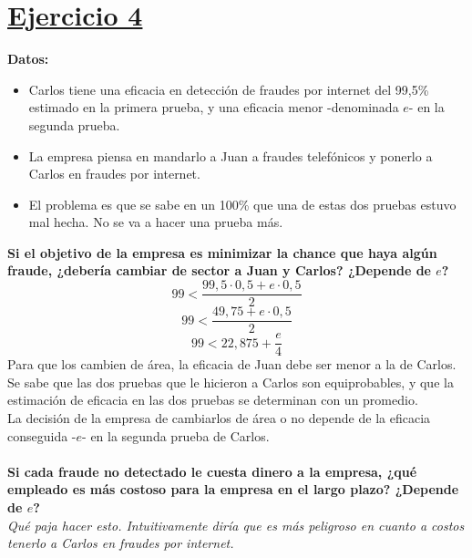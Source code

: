 \documentclass{article}
\begin{document}
    \section*{\underline{Ejercicio 4}}
        \textbf{Datos:}
        \begin{itemize}
            \item Carlos tiene una eficacia en detección de fraudes por internet del 99,5\% estimado en la primera prueba, y una eficacia menor -denominada $e$- en la segunda prueba. 
            \item La empresa piensa en mandarlo a Juan a fraudes telefónicos y ponerlo a Carlos en fraudes por internet.
            \item El problema es que se sabe en un 100\% que una de estas dos pruebas estuvo mal hecha. No se va a hacer una prueba más.
        \end{itemize}
        \textbf{Si el objetivo de la empresa es minimizar la chance que haya algún fraude, ¿debería cambiar de sector a Juan y Carlos? ¿Depende de $e$?}
        \\
        \[99 < \frac{99,5 \cdot 0,5 + e \cdot 0,5}{2}\]
        \[99 < \frac{49,75 + e \cdot 0,5}{2}\]
        \[99 < 22,875 + \frac{e}{4}\]
        Para que los cambien de área, la eficacia de Juan debe ser menor a la de Carlos. Se sabe que las dos pruebas que le hicieron a Carlos son equiprobables, y que la estimación de eficacia en las dos pruebas se determinan con un promedio.
        \\
        La decisión de la empresa de cambiarlos de área o no depende de la eficacia conseguida -$e$- en la segunda prueba de Carlos.
        \\
        \\
        \textbf{Si cada fraude no detectado le cuesta dinero a la empresa, ¿qué empleado es más costoso para la empresa en el largo plazo? ¿Depende de $e$?}
        \\
        \textit{Qué paja hacer esto. Intuitivamente diría que es más peligroso en cuanto a costos tenerlo a Carlos en fraudes por internet.}
\end{document}
